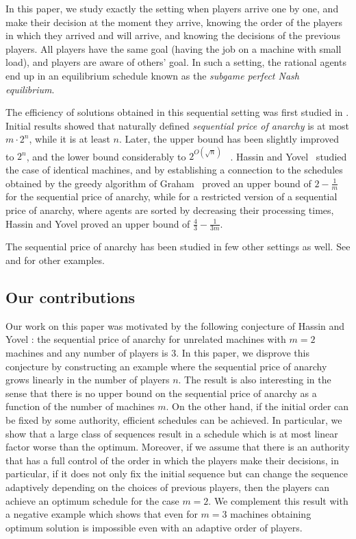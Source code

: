 \documentclass[12pt,a4paper]{article}
\theoremstyle{definition}
\theoremstyle{remark}
\begin{document}
In this paper, we study exactly the setting when players arrive one by one, and make their decision at the moment they arrive, knowing the order of the players in which they arrived and will arrive, and knowing the decisions of the previous players.
%
All players have the same goal (having the job on a machine with small load), and players are aware of others' goal.
%
In such a setting, the rational agents end up in an equilibrium schedule known as the \emph{subgame perfect Nash equilibrium}.
%

The efficiency of solutions obtained in this sequential setting was first studied in \cite{originalSPOA}. Initial results showed that naturally defined \emph{sequential price of anarchy} is at most $m\cdot 2^n$, while it is at least $n$. Later, the upper bound has been slightly improved to $2^n$, and the lower bound considerably to $2^{O(\sqrt{n})}$~ \cite{bilo}. 
%
Hassin and Yovel~\cite{Hassin} studied the case of identical machines, and by establishing a connection to the schedules obtained by the greedy algorithm of Graham~\cite{Graham} proved an upper bound of $2-\frac{1}{m}$ for the sequential price of anarchy, while for a restricted version of a sequential price of anarchy, where agents are sorted by decreasing their processing times, Hassin and Yovel \cite{Hassin} proved an upper bound of $\frac{4}{3}-\frac{1}{3m}$.

The sequential price of anarchy has been studied in few other settings as well. See \cite{originalSPOA} and \cite{SPOAcongestion} for other examples.

\subsection{Our contributions}\label{sec:contributions}

Our work on this paper was motivated by the following conjecture of Hassin and Yovel \cite{Hassin}: the sequential price of anarchy for unrelated machines with $m=2$ machines and any number of players is $3$. 
%
In this paper, we disprove this conjecture by constructing an example where the sequential price of anarchy grows linearly in the number of players $n$. 
%
The result is also interesting in the sense that there is no upper bound on the sequential price of anarchy as a function of the number of machines $m$. 
%
On the other hand, if the initial order can be fixed by some authority, efficient schedules can be achieved. 
%
In particular, we show that a large class of sequences result in a schedule which is at most linear factor worse than the optimum.
%
Moreover, if we assume that there is an authority that has a full control of the order in which the players make their decisions,  in particular, if it does not only fix the initial sequence but can change the sequence adaptively depending on the choices of previous players, then the players can achieve an optimum schedule for the case $m=2$.
%
We complement this result with a negative example which shows that even for $m=3$ machines obtaining optimum solution is impossible even with an adaptive order of players. 
\end{document}
